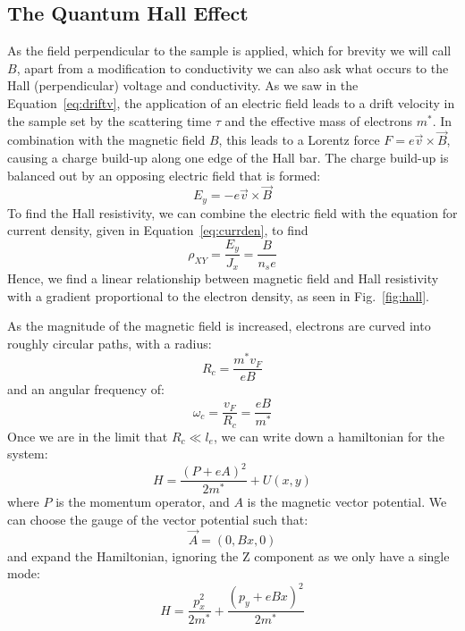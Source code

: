 \subsection{The Quantum Hall Effect}
As the field perpendicular to the sample is applied, which for brevity we will call $B$, apart from a modification to conductivity
we can also ask what occurs to the Hall (perpendicular) voltage and conductivity. As we saw in the Equation~\ref{eq:driftv},
the application of an electric field leads to a drift velocity in the sample set by the scattering
time $\tau$ and the effective mass of electrons $m^*$. In combination with the magnetic field $B$, this leads to a Lorentz force $F = e \vec v \times \vec B$, causing
a charge build-up along one edge of the Hall bar. The charge build-up is balanced out by an opposing electric field that is formed:
\begin{equation}
  E_y = -e \vec v \times \vec B
\end{equation}
To find the Hall resistivity, we can combine the electric field with the equation for current density, given in Equation~\ref{eq:currden}, to find
\begin{equation}
  \rho_{XY} = \frac{E_y}{J_x} = \frac{B}{n_s e}
\end{equation}
Hence, we find a linear relationship between magnetic field and Hall resistivity with a gradient proportional to the electron density, as seen in Fig.~\ref{fig:hall}.

As the magnitude of the magnetic field is increased, electrons are curved into roughly circular paths, with a radius:
\begin{equation}
  R_c = \frac{m^* v_F}{e B}
\end{equation}
and an angular frequency of:
\begin{equation}
  \omega_c = \frac{v_F}{R_c} = \frac{e B}{m^*}
  \label{eq:cycl}
\end{equation}
Once we are in the limit that $R_c \ll l_e$, we can write down a hamiltonian for the system:
\begin{equation}
  H = \frac{(P + eA)^2}{2m^*} + U(x, y)
\end{equation}
where $P$ is the momentum operator, and $A$ is the magnetic vector potential. We can choose the gauge of the vector potential such
that:
\begin{equation}
  \vec{A} = (0, Bx, 0)
\end{equation}
and expand the Hamiltonian, ignoring the Z component as we only have a single mode:
\begin{equation}
  H = \frac{p_x^2}{2m^*} + \frac{(p_y + eBx)^2}{2m^*}
\end{equation}

